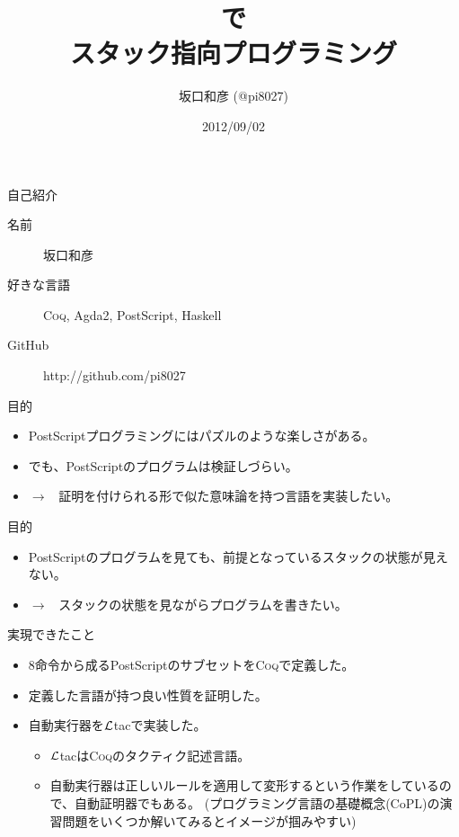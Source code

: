 \documentclass[cjk, 14pt, dvipdfm]{beamer}
\title{\Coq{}で\\スタック指向プログラミング}
\author{坂口和彦 (@pi8027)}
\institute{筑波大学 情報学群 情報科学類 B2}
\date{2012/09/02}
\newcommand{\Coq}{{\scshape{}Coq}}
\newcommand{\Ltac}{\mbox{\emph{$\cal L$}tac}}
\begin{document}
\begin{frame}[plain]

 \maketitle

\end{frame}

\begin{frame}{自己紹介}

  \begin{description}
    \item [名前] 坂口和彦
    \item [好きな言語] \Coq, Agda2, PostScript, Haskell
    \item [GitHub] http://github.com/pi8027
  \end{description}

\end{frame}

\begin{frame}{目的}

  \begin{itemize}
    \item PostScriptプログラミングにはパズルのような楽しさがある。
    \item でも、PostScriptのプログラムは検証しづらい。
    \item $\rightarrow$ \, 証明を付けられる形で似た意味論を持つ言語を実装したい。
  \end{itemize}

\end{frame}

\begin{frame}{目的}

  \begin{itemize}
    \item PostScriptのプログラムを見ても、前提となっているスタックの状態が見えない。
    \item $\rightarrow$ \, スタックの状態を見ながらプログラムを書きたい。
  \end{itemize}

\end{frame}

\begin{frame}{実現できたこと}

  \begin{itemize}
    \item 8命令から成るPostScriptのサブセットを\Coq{}で定義した。
    \item 定義した言語が持つ良い性質を証明した。
    \item 自動実行器を\Ltac{}で実装した。
    \begin{itemize}
      \item \Ltac{}は\Coq{}のタクティク記述言語。
      \item 自動実行器は正しいルールを適用して変形するという作業をしているので、自動証明器でもある。
        (プログラミング言語の基礎概念(CoPL)の演習問題をいくつか解いてみるとイメージが掴みやすい)
    \end{itemize}
  \end{itemize}

\end{frame}
\end{document}
